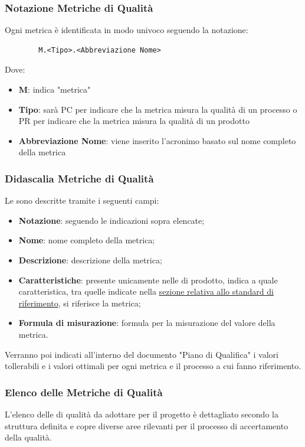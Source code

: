 \subsubsection{Notazione Metriche di Qualità}
Ogni metrica è identificata in modo univoco seguendo la notazione: 
\begin{lstlisting}
        M.<Tipo>.<Abbreviazione Nome>
\end{lstlisting}
Dove:
\begin{itemize}
    \item \textbf{M}: indica "metrica"
    \item \textbf{Tipo}: sarà PC per indicare che la metrica misura la qualità di un processo o PR per indicare che la metrica misura la qualità di un prodotto
    \item \textbf{Abbreviazione Nome}: viene inserito l'acronimo basato sul nome completo della metrica
\end{itemize}
\subsubsection{Didascalia Metriche di Qualità}
Le  sono descritte tramite i seguenti campi:
\begin{itemize}
    \item \textbf{Notazione}: seguendo le indicazioni sopra elencate;
    \item \textbf{Nome}: nome completo della metrica;
    \item \textbf{Descrizione}: descrizione della metrica;
    \item \textbf{Caratteristiche}: presente unicamente nelle  di prodotto, indica a quale caratteristica, tra quelle indicate nella \hyperref[subsubsec:standard_normativo]{sezione relativa allo standard di riferimento}, si riferisce la metrica;
    \item \textbf{Formula di misurazione}: formula per la misurazione del valore della metrica.
\end{itemize}
Verranno poi indicati all'interno del documento "Piano di Qualifica" i valori tollerabili e i valori ottimali per ogni metrica e il processo a cui fanno riferimento.
\subsubsection{Elenco delle Metriche di Qualità} 
L'elenco delle  di qualità da adottare per il progetto è dettagliato secondo la struttura definita e copre diverse aree rilevanti per il processo di accertamento della qualità.
